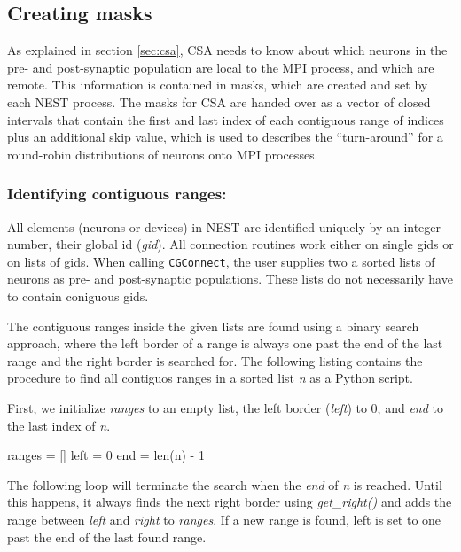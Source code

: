 \documentclass{frontiersSCNS} %
\begin{document}
\subsection{Creating masks}\label{sec:creating_masks}

As explained in section \ref{sec:csa}, CSA needs to know about which
neurons in the pre- and post-synaptic population are local to the MPI
process, and which are remote. This information is contained in masks,
which are created and set by each NEST process. The masks for CSA are
handed over as a vector of closed intervals that contain the first and
last index of each contiguous range of indices plus an additional skip
value, which is used to describes the ``turn-around'' for a round-robin
distributions of neurons onto MPI processes.

\subsubsection*{Identifying contiguous ranges:}

All elements (neurons or devices) in NEST are identified uniquely by
an integer number, their global id (\emph{gid}). All connection
routines work either on single gids or on lists of gids. When calling
\texttt{CGConnect}, the user supplies two a sorted lists of neurons as
pre- and post-synaptic populations. These lists do not necessarily
have to contain coniguous gids.

The contiguous ranges inside the given lists are found using a binary
search approach, where the left border of a range is always one past
the end of the last range and the right border is searched for. The
following listing contains the procedure to find all contiguos ranges
in a sorted list \emph{n} as a Python script.

First, we initialize \emph{ranges} to an empty list, the left border
(\emph{left}) to 0, and \emph{end} to the last index of \emph{n}.

\begin{pythoncode}
ranges = []
left = 0
end = len(n) - 1
\end{pythoncode}

The following loop will terminate the search when the \emph{end} of
\emph{n} is reached. Until this happens, it always finds the next
right border using \emph{get\_right()} and adds the range between
\emph{left} and \emph{right} to \emph{ranges}. If a new range is
found, left is set to one past the end of the last found range.
\end{document}
